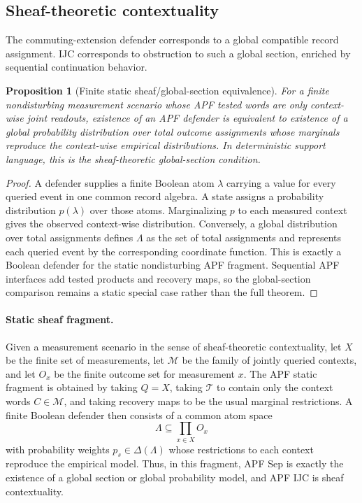 \documentclass[11pt]{article}
\newtheorem{proposition}[theorem]{Proposition}
\begin{document}
\subsection*{Sheaf-theoretic contextuality}
The commuting-extension defender corresponds to a global compatible record assignment.  IJC corresponds to obstruction to such a global section, enriched by sequential continuation behavior.

\begin{proposition}[Finite static sheaf/global-section equivalence]
\label{prop:finite-static-sheaf-equivalence}
For a finite nondisturbing measurement scenario whose APF tested words are only context-wise joint readouts, existence of an APF defender is equivalent to existence of a global probability distribution over total outcome assignments whose marginals reproduce the context-wise empirical distributions.  In deterministic support language, this is the sheaf-theoretic global-section condition.
\end{proposition}
\begin{proof}
A defender supplies a finite Boolean atom \(\lambda\) carrying a value for every queried event in one common record algebra.  A state assigns a probability distribution \(p(\lambda)\) over those atoms.  Marginalizing \(p\) to each measured context gives the observed context-wise distribution.  Conversely, a global distribution over total assignments defines \(\Lambda\) as the set of total assignments and represents each queried event by the corresponding coordinate function.  This is exactly a Boolean defender for the static nondisturbing APF fragment.  Sequential APF interfaces add tested products and recovery maps, so the global-section comparison remains a static special case rather than the full theorem.
\end{proof}

\paragraph{Static sheaf fragment.}
Given a measurement scenario in the sense of sheaf-theoretic
contextuality, let $X$ be the finite set of measurements, let
$\mathcal M$ be the family of jointly queried contexts, and let $O_x$
be the finite outcome set for measurement $x$.  The APF static
fragment is obtained by taking $Q=X$, taking $\mathcal T$ to contain
only the context words $C\in\mathcal M$, and taking recovery maps to
be the usual marginal restrictions.  A finite Boolean defender then
consists of a common atom space
\[
    \Lambda \subseteq \prod_{x\in X} O_x
\]
with probability weights $p_s\in\Delta(\Lambda)$ whose restrictions to
each context reproduce the empirical model.  Thus, in this fragment,
APF Sep is exactly the existence of a global section or global
probability model, and APF IJC is sheaf contextuality.
\end{document}
